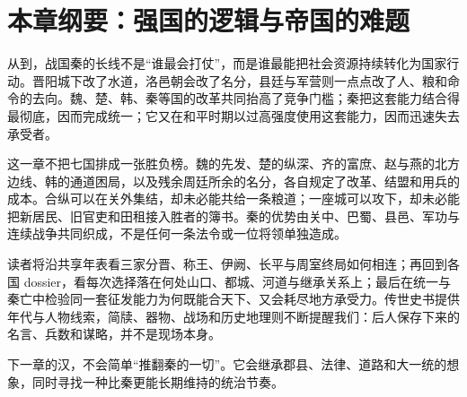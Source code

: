 \section{本章纲要：强国的逻辑与帝国的难题}

从到，战国秦的长线不是“谁最会打仗”，而是谁最能把社会资源持续转化为国家行动。晋阳城下改了水道，洛邑朝会改了名分，县廷与军营则一点点改了人、粮和命令的去向。魏、楚、韩、秦等国的改革共同抬高了竞争门槛；秦把这套能力结合得最彻底，因而完成统一；它又在和平时期以过高强度使用这套能力，因而迅速失去承受者。

这一章不把七国排成一张胜负榜。魏的先发、楚的纵深、齐的富庶、赵与燕的北方边线、韩的通道困局，以及残余周廷所余的名分，各自规定了改革、结盟和用兵的成本。合纵可以在关外集结，却未必能共给一条粮道；一座城可以攻下，却未必能把新居民、旧官吏和田租接入胜者的簿书。秦的优势由关中、巴蜀、县邑、军功与连续战争共同织成，不是任何一条法令或一位将领单独造成。

读者将沿共享年表看三家分晋、称王、伊阙、长平与周室终局如何相连；再回到各国 dossier，看每次选择落在何处山口、都城、河道与继承关系上；最后在统一与秦亡中检验同一套征发能力为何既能合天下、又会耗尽地方承受力。传世史书提供年代与人物线索，简牍、器物、战场和历史地理则不断提醒我们：后人保存下来的名言、兵数和谋略，并不是现场本身。

下一章的汉，不会简单“推翻秦的一切”。它会继承郡县、法律、道路和大一统的想象，同时寻找一种比秦更能长期维持的统治节奏。
